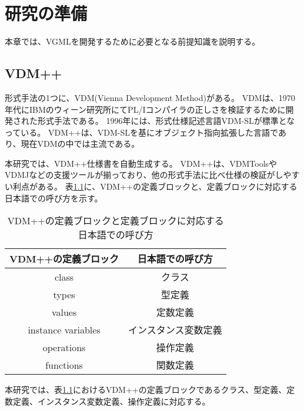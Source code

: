 \chapter{研究の準備}
\label{cha:Preparation}

本章では、VGMLを開発するために必要となる前提知識を説明する。

\section{VDM++}
\label{sec:vdm}

形式手法の1つに、VDM(Vienna Development Method)がある\cite{}。
VDMは、1970年代にIBMのウィーン研究所にてPL/Iコンパイラの正しさを検証するために開発された形式手法である。
1996年には、形式仕様記述言語VDM-SLが標準となっている\cite{}。
VDM++は、VDM-SLを基にオブジェクト指向拡張した言語であり、現在VDMの中では主流である。

本研究では、VDM++仕様書を自動生成する。
VDM++は、VDMTools\cite{}やVDMJ\cite{}などの支援ツールが揃っており、他の形式手法に比べ仕様の検証がしやすい利点がある。
表\ref{table:vdm_block}に、VDM++の定義ブロックと、定義ブロックに対応する日本語での呼び方を示す。

\begin{table}[t]
    \begin{center}      
        \caption{VDM++の定義ブロックと定義ブロックに対応する日本語での呼び方}\label{table:vdm_block}
        \begin{tabular}{c|c}
        VDM++の定義ブロック  & 日本語での呼び方　\\ \hline \hline
        class & クラス \\ \hline
        types	 & 型定義 \\ \hline
        values  & 定数定義 \\ \hline
        instance variables & インスタンス変数定義 \\ \hline
        operations & 操作定義 \\ \hline 
        functions  & 関数定義 \\ \hline 
        \end{tabular}
    \end{center}
\end{table}

本研究では、表\ref{table:vdm_block}におけるVDM++の定義ブロックであるクラス、型定義、定数定義、インスタンス変数定義、操作定義に対応する。

